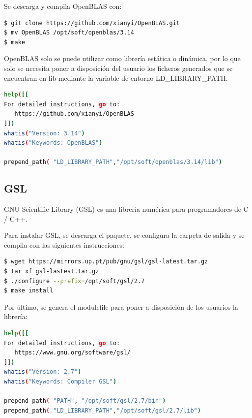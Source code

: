 Se descarga y compila OpenBLAS con:

\vspace{4mm}
\begin{lstlisting}[language=bash]
$ git clone https://github.com/xianyi/OpenBLAS.git
$ mv OpenBLAS /opt/soft/openblas/3.14
$ make
\end{lstlisting}
\vspace{4mm}

OpenBLAS solo se puede utilizar como librería estática o dinámica, por lo que solo se necesita poner a disposición del usuario los ficheros generados que se encuentran en lib mediante la variable de entorno LD\_LIBRARY\_PATH.
\vspace{2mm}
\begin{lstlisting}[language=bash,caption={Modulefile de OpenBLAS},xleftmargin=.15\textwidth]
help([[
For detailed instructions, go to:
   https://github.com/xianyi/OpenBLAS
]])
whatis("Version: 3.14")
whatis("Keywords: OpenBLAS")

prepend_path( "LD_LIBRARY_PATH","/opt/soft/openblas/3.14/lib")
\end{lstlisting}
\vspace{4mm}

\subsection{GSL}
GNU Scientific Library \cite{gsl} (GSL) es una librería numérica para programadores de C / C++.
\vspace{4mm}

Para instalar GSL, se descarga el paquete, se configura la carpeta de salida y se compila con las siguientes instrucciones:

\begin{lstlisting}[language=bash]
$ wget https://mirrors.up.pt/pub/gnu/gsl/gsl-latest.tar.gz
$ tar xf gsl-lastest.tar.gz
$ ./configure --prefix=/opt/soft/gsl/2.7
$ make install
\end{lstlisting}
\vspace{4mm}

Por último, se genera el modulefile para poner a disposición de los usuarios la librería:
\vspace{4mm}

\begin{lstlisting}[language=bash,caption={Modulefile de GSL},xleftmargin=.15\textwidth]
help([[
For detailed instructions, go to:
   https://www.gnu.org/software/gsl/
]])
whatis("Version: 2.7")
whatis("Keywords: Compiler GSL")

prepend_path( "PATH", "/opt/soft/gsl/2.7/bin")
prepend_path( "LD_LIBRARY_PATH","/opt/soft/gsl/2.7/lib")
\end{lstlisting}
\vspace{4mm}

